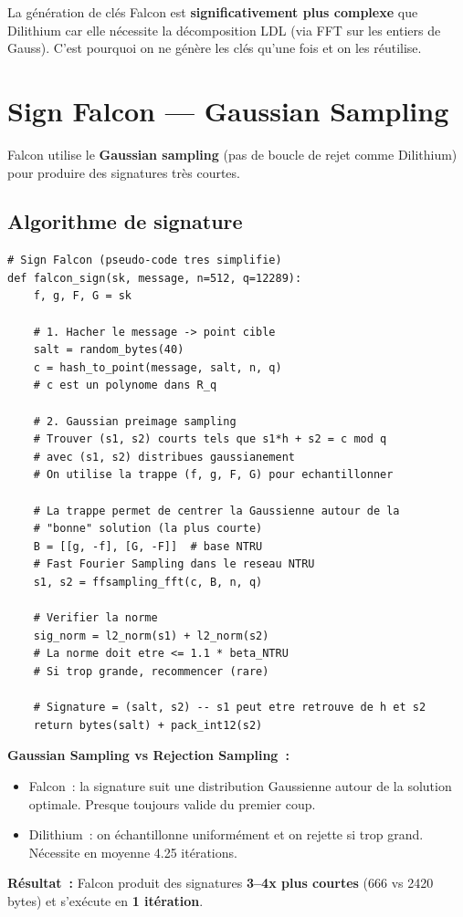 \documentclass[12pt, a4paper]{article}
\begin{document}
\begin{warningbox}
La génération de clés Falcon est \textbf{significativement plus complexe}
que Dilithium car elle nécessite la décomposition LDL (via FFT sur les
entiers de Gauss). C'est pourquoi on ne génère les clés qu'une fois
et on les réutilise.
\end{warningbox}

\section{Sign Falcon --- Gaussian Sampling}

Falcon utilise le \textbf{Gaussian sampling} (pas de boucle de rejet
comme Dilithium) pour produire des signatures très courtes.

\subsection{Algorithme de signature}

\begin{lstlisting}[style=python]
# Sign Falcon (pseudo-code tres simplifie)
def falcon_sign(sk, message, n=512, q=12289):
    f, g, F, G = sk

    # 1. Hacher le message -> point cible
    salt = random_bytes(40)
    c = hash_to_point(message, salt, n, q)
    # c est un polynome dans R_q

    # 2. Gaussian preimage sampling
    # Trouver (s1, s2) courts tels que s1*h + s2 = c mod q
    # avec (s1, s2) distribues gaussianement
    # On utilise la trappe (f, g, F, G) pour echantillonner

    # La trappe permet de centrer la Gaussienne autour de la
    # "bonne" solution (la plus courte)
    B = [[g, -f], [G, -F]]  # base NTRU
    # Fast Fourier Sampling dans le reseau NTRU
    s1, s2 = ffsampling_fft(c, B, n, q)

    # Verifier la norme
    sig_norm = l2_norm(s1) + l2_norm(s2)
    # La norme doit etre <= 1.1 * beta_NTRU
    # Si trop grande, recommencer (rare)

    # Signature = (salt, s2) -- s1 peut etre retrouve de h et s2
    return bytes(salt) + pack_int12(s2)
\end{lstlisting}

\begin{importantbox}
\textbf{Gaussian Sampling vs Rejection Sampling~:}
\begin{itemize}
  \item Falcon~: la signature suit une distribution Gaussienne autour
        de la solution optimale. Presque toujours valide du premier coup.
  \item Dilithium~: on échantillonne uniformément et on rejette si trop grand.
        Nécessite en moyenne 4.25 itérations.
\end{itemize}
\textbf{Résultat~:} Falcon produit des signatures \textbf{3--4x plus courtes}
(666 vs 2420 bytes) et s'exécute en \textbf{1 itération}.
\end{importantbox}
\end{document}
